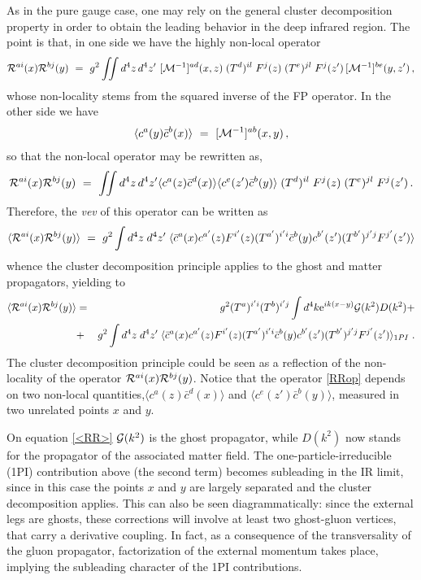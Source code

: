 As in the pure gauge case, one may rely on the general cluster decomposition property in order
to obtain the leading behavior in the deep infrared region. The point is that, in one side we
have the highly non-local operator
\begin{eqnarray}
{\cal R}^{ai}(x)  {\cal R}^{bj}(y) ~=~ g^{2} \iint d^{4}z\,d^{4}z'\,\, [{\cal
M}^{-1}]^{ad} (x,z)   \;(T^d)^{il} \;F^{j}(z) \;(T^e)^{jl} \;F^{j}(z')  \,[{\cal M}^{-1}]^{be}
(y,z')\,,
\end{eqnarray}
whose non-locality stems from the squared inverse of the FP operator. In the other side we have
\begin{eqnarray}
\langle c^{a}(y)\bar{c}^{b}(x) \rangle ~=~ [{\cal M}^{-1}]^{ab} (x,y)\,,
\end{eqnarray}
so that the non-local operator may be rewritten as,
\begin{eqnarray}
{\cal R}^{ai}(x)  {\cal R}^{bj}(y) ~=~ \iint d^{4}z\,d^{4}z' 
\langle c^{a}(z)\bar{c}^{d}(x) \rangle  \langle c^{e}(z')\bar{c}^{b}(y) \rangle \;(T^d)^{il}
\;F^{j}(z) \;(T^e)^{jl} \;F^{j}(z')  \,.
\label{RRop}
\end{eqnarray}
Therefore, the \emph{vev} of this operator can be written as
\begin{eqnarray}
\langle {{\cal R}}^{ai}(x) {{\cal R}}^{bj}(y)\rangle 
~=~ 
{g^{2}}   \int d^{4}z\;d^{4}z'\; \langle \bar{c}^{a}(x) c^{a'}(z) F^{i'}(z) (T^{a'})^{i'i}
\bar{c}^b(y) c^{b'}(z') (T^{b'})^{j'j} F^{j'} (z') 
\rangle
\end{eqnarray}
whence the cluster decomposition principle applies to the ghost and matter propagators,
yielding to
\begin{eqnarray}
\langle {{\cal R}}^{ai}(x) {{\cal R}}^{bj}(y)\rangle 
&=& g^2  (T^{a})^{i'i} (T^{b})^{i'j}\int d^4k {\rm e}^{ik(x-y)}{\cal G}(k^{2})D(k^2)+
\nonumber\\
&+&
{g^{2}}   \int d^{4}z\;d^{4}z'\; \langle \bar{c}^{a}(x) c^{a'}(z) F^{i'}(z) (T^{a'})^{i'i}
\bar{c}^b(y) c^{b'}(z') (T^{b'})^{j'j} F^{j'} (z') 
\rangle_{1PI}
\;.
\label{<RR>}
\end{eqnarray}
The cluster decomposition principle could be seen as a reflection of the non-locality of the
operator ${{\cal R}}^{ai}(x) {{\cal R}}^{bj}(y)$. Notice that the operator \eqref{RRop} depends
on two non-local quantities,$\langle c^{a}(z)\bar{c}^{d}(x) \rangle$ and $\langle
c^{e}(z')\bar{c}^{b}(y) \rangle$, measured in two unrelated points $x$ and $y$.

On equation \eqref{<RR>} ${\cal G}(k^2)$ is the ghost propagator, while $D(k^2)$ now stands for the propagator of
the associated matter field. The one-particle-irreducible (1PI) contribution above (the second
term) becomes subleading in the IR limit, since in this case the points $x$ and $y$ are largely
separated and
the cluster decomposition applies. This can also be seen diagrammatically: since the external legs
are ghosts, these corrections will involve at least two ghost-gluon vertices, that carry a
derivative coupling.
In fact, as a consequence of the transversality  of the gluon propagator, factorization of the
external momentum takes place, implying the subleading character of the 1PI contributions.

